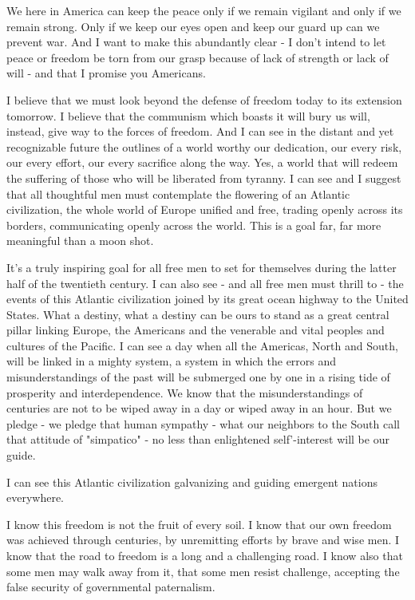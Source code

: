 \documentclass{article}
\begin{document}
We here in America can keep the peace only if we remain vigilant and only if we
remain strong. Only if we keep our eyes open and keep our guard up can we
prevent war. And I want to make this abundantly clear - I don't intend to let
peace or freedom be torn from our grasp because of lack of strength or lack of
will - and that I promise you Americans.

I believe that we must look beyond the defense of freedom today to its
extension tomorrow. I believe that the communism which boasts it will bury us
will, instead, give way to the forces of freedom. And I can see in the distant
and yet recognizable future the outlines of a world worthy our dedication, our
every risk, our every effort, our every sacrifice along the way. Yes, a world
that will redeem the suffering of those who will be liberated from tyranny. I
can see and I suggest that all thoughtful men must contemplate the flowering of
an Atlantic civilization, the whole world of Europe unified and free, trading
openly across its borders, communicating openly across the world. This is a
goal far, far more meaningful than a moon shot.

It's a truly inspiring goal for all free men to set for themselves during the
latter half of the twentieth century. I can also see - and all free men must
thrill to - the events of this Atlantic civilization joined by its great ocean
highway to the United States. What a destiny, what a destiny can be ours to
stand as a great central pillar linking Europe, the Americans and the venerable
and vital peoples and cultures of the Pacific. I can see a day when all the
Americas, North and South, will be linked in a mighty system, a system in which
the errors and misunderstandings of the past will be submerged one by one in a
rising tide of prosperity and interdependence. We know that the
misunderstandings of centuries are not to be wiped away in a day or wiped away
in an hour. But we pledge - we pledge that human sympathy - what our neighbors
to the South call that attitude of "simpatico" - no less than enlightened
self'-interest will be our guide.

I can see this Atlantic civilization galvanizing and guiding emergent nations
everywhere.

I know this freedom is not the fruit of every soil. I know that our own freedom
was achieved through centuries, by unremitting efforts by brave and wise men. I
know that the road to freedom is a long and a challenging road. I know also
that some men may walk away from it, that some men resist challenge, accepting
the false security of governmental paternalism.
\end{document}
